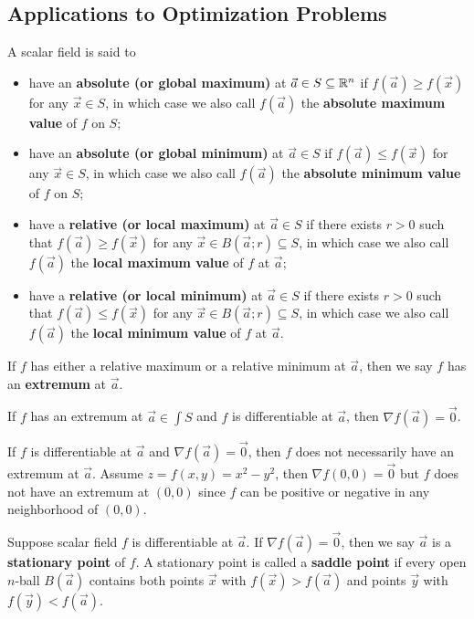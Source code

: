 \documentclass[a4paper]{ctexart}
\begin{document}
    \subsection{Applications to Optimization Problems}
    \begin{mydef}
        A scalar field is said to
        \begin{itemize}
            \item have an \textbf{absolute (or global maximum)} at $\vec a \in S \subseteq \mathbb{R}^n$ if $f(\vec a) \ge f(\vec x)$ for any $\vec x \in S$, in which case we also call $f(\vec a)$ the \textbf{absolute maximum value} of $f$ on $S$;
            \item have an \textbf{absolute (or global minimum)} at $\vec a \in S$ if $f(\vec a) \le f(\vec x)$ for any $\vec x \in S$, in which case we also call $f(\vec a)$ the \textbf{absolute minimum value} of $f$ on $S$;
            \item have a \textbf{relative (or local maximum)} at $\vec a \in S$ if there exists $r>0$ such that $f(\vec a) \ge f(\vec x)$ for any $\vec x \in B(\vec a; r)\subseteq S$, in which case we also call $f(\vec a)$ the \textbf{local maximum value} of $f$ at $\vec a$;
            \item have a \textbf{relative (or local minimum)} at $\vec a \in S$ if there exists $r>0$ such that $f(\vec a) \le f(\vec x)$ for any $\vec x \in B(\vec a; r)\subseteq S$, in which case we also call $f(\vec a)$ the \textbf{local minimum value} of $f$ at $\vec a$.
        \end{itemize}
        If $f$ has either a relative maximum or a relative minimum at $\vec a$, then we say $f$ has an \textbf{extremum} at $\vec a$.
    \end{mydef}
    \begin{mythm}
        If $f$ has an extremum at $\vec a\in \int S$ and $f$ is differentiable at $\vec a$, then $\nabla f(\vec a) = \vec 0$.
    \end{mythm}
    \begin{myrmk}
        If $f$ is differentiable at $\vec a$ and $\nabla f(\vec a) = \vec 0$, then $f$ does not necessarily have an extremum at $\vec a$. Assume $z=f(x,y) = x^2 - y^2$, then $\nabla f(0,0) = \vec 0$ but $f$ does not have an extremum at $(0,0)$ since $f$ can be positive or negative in any neighborhood of $(0,0)$.
    \end{myrmk}
    \begin{mydef}
        Suppose scalar field $f$ is differentiable at $\vec a$. If $\nabla f(\vec a) = \vec 0$, then we say $\vec a$ is a \textbf{stationary point} of $f$. A stationary point is called a \textbf{saddle point} if every open $n$-ball $B(\vec a)$ contains both points $\vec x$ with $f(\vec x) > f(\vec a)$ and points $\vec y$ with $f(\vec y) < f(\vec a)$.
    \end{mydef}
\end{document}

